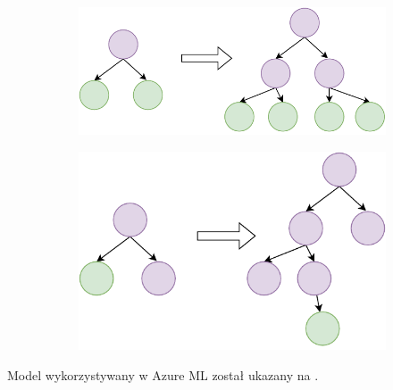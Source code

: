 \begin{figure}[H]
    \begin{subfigure}[m]{\textwidth}
        \includegraphics[width=\textwidth]{images/level-wise}
    \end{subfigure}
    \begin{subfigure}[m]{\textwidth}
        \includegraphics[width=\textwidth]{images/leaf-wise}
    \end{subfigure}
    \label{fig:leaf}
\end{figure}

Model wykorzystywany w Azure ML został ukazany na .

